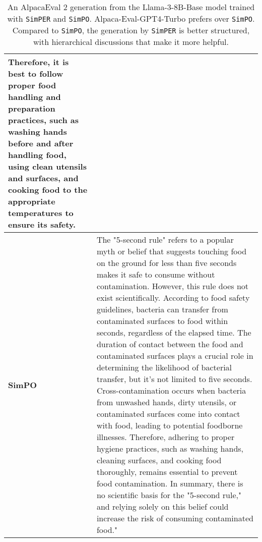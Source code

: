 \begin{table}[!h]
\begin{tabular}{lp{11.5cm}}
Therefore, it is best to follow proper food handling and preparation practices, such as washing hands before and after handling food, using clean utensils and surfaces, and cooking food to the appropriate temperatures to ensure its safety. \\
        \midrule
        \bf{SimPO} & 
The "5-second rule" refers to a popular myth or belief that suggests touching food on the ground for less than five seconds makes it safe to consume without contamination. However, this rule does not exist scientifically.
According to food safety guidelines, bacteria can transfer from contaminated surfaces to food within seconds, regardless of the elapsed time. The duration of contact between the food and contaminated surfaces plays a crucial role in determining the likelihood of bacterial transfer, but it's not limited to five seconds.
Cross-contamination occurs when bacteria from unwashed hands, dirty utensils, or contaminated surfaces come into contact with food, leading to potential foodborne illnesses. Therefore, adhering to proper hygiene practices, such as washing hands, cleaning surfaces, and cooking food thoroughly, remains essential to prevent food contamination.
In summary, there is no scientific basis for the "5-second rule," and relying solely on this belief could increase the risk of consuming contaminated food."
        \\
        \bottomrule[1pt]
    \end{tabular}
    \caption{An AlpacaEval 2 generation from the Llama-3-8B-Base model trained with \texttt{SimPER} and \texttt{SimPO}. Alpaca-Eval-GPT4-Turbo prefers \method over \texttt{SimPO}. Compared to \texttt{SimPO}, the generation by \texttt{SimPER} is better structured, with hierarchical discussions that make it more helpful. 
    }
    \label{tab:case-1}
\end{table}



